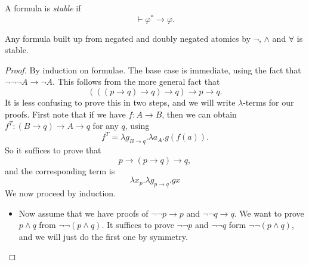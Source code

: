 \documentclass[a4paper]{article}
\begin{document}
\begin{defi}
  A formula is \emph{stable} if
  \[
    \vdash \varphi^* \to \varphi.
  \]
\end{defi}

\begin{lemma}
  Any formula built up from negated and doubly negated atomics by $\neg$, $\wedge$ and $\forall$ is stable.
\end{lemma}

\begin{proof}
  By induction on formulae. The base case is immediate, using the fact that $\neg \neg \neg A \to \neg A$. This follows from the more general fact that
  \[
    (((p \to q) \to q) \to q) \to p \to q.
  \]
  It is less confusing to prove this in two steps, and we will write $\lambda$-terms for our proofs. First note that if we have $f: A \to B$, then we can obtain $f^T: (B \to q) \to A \to q$ for any $q$, using
  \[
    f^T = \lambda g_{B \to q}. \lambda a_A. g(f(a)).
  \]
  So it suffices to prove that
  \[
    p \to (p \to q) \to q,
  \]
  and the corresponding term is
  \[
    \lambda x_p. \lambda g_{p \to q}. g x
  \]
  We now proceed by induction.
  \begin{itemize}
    \item Now assume that we have proofs of $\neg \neg p \to p$ and $\neg \neg q \to q$. We want to prove $p \wedge q$ from $\neg \neg (p \wedge q)$. It suffices to prove $\neg \neg p$ and $\neg \neg q$ form $\neg \neg (p \wedge q)$, and we will just do the first one by symmetry.


\end{itemize}
\end{proof}
\end{document}

